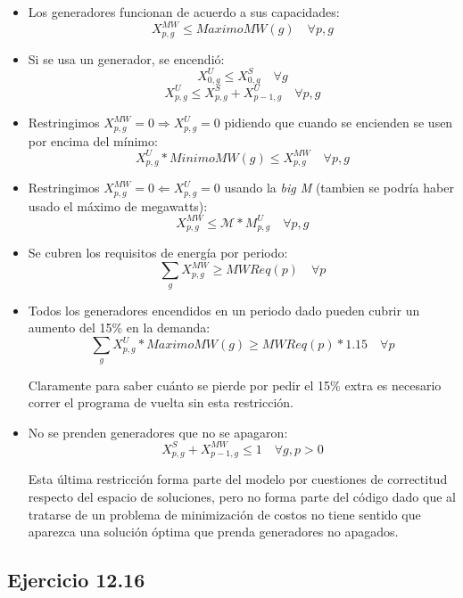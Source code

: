 \begin{itemize}
    \item Los generadores funcionan de acuerdo a sus capacidades:
    $$ X^{MW}_{p,g} \leq MaximoMW(g) \quad \forall p,g $$

    \item Si se usa un generador, se encendió:
    $$ X^U_{0,g} \leq X^S_{0,g} \quad \forall g $$
    $$ X^U_{p,g} \leq X^S_{p,g} + X^U_{p-1,g} \quad \forall p,g $$

    \item Restringimos $X^{MW}_{p,g} = 0 \Rightarrow X^{U}_{p,g} = 0$ pidiendo que cuando se encienden se usen por encima del mínimo:
    $$ X^U_{p,g}*MinimoMW(g) \leq X^{MW}_{p,g} \quad \forall p,g $$

    \item Restringimos $X^{MW}_{p,g} = 0 \Leftarrow X^{U}_{p,g} = 0$ usando la \emph{big M} (tambien se podría haber usado el máximo de megawatts):
    $$ X^{MW}_{p,g} \leq \mathcal{M}*M^{U}_{p,g} \quad \forall p,g$$

    \item Se cubren los requisitos de energía por periodo:
    $$ \sum_{g} X^{MW}_{p,g} \geq MWReq(p) \quad \forall p $$

    \item Todos los generadores encendidos en un periodo dado pueden cubrir un aumento del 15\% en la demanda:
    $$ \sum_{g} X^{U}_{p,g}*MaximoMW(g) \geq MWReq(p)*1.15 \quad \forall p $$

    Claramente para saber cuánto se pierde por pedir el 15\% extra es necesario correr el programa de vuelta sin esta restricción.

    \item No se prenden generadores que no se apagaron:
    $$ X^S_{p,g} + X^{MW}_{p-1,g} \leq 1 \quad \forall g,p>0 $$

    Esta última restricción forma parte del modelo por cuestiones de correctitud respecto del espacio de soluciones, pero no forma parte del código dado que al tratarse de un problema de minimización de costos no tiene sentido que aparezca una solución óptima que prenda generadores no apagados.

\end{itemize}

\subsection{Ejercicio 12.16}

